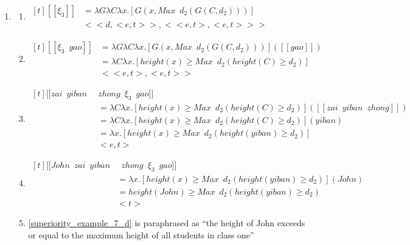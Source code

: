 \documentclass{ctexart}
\begin{document}
\begin{enumerate}
    \item \label{superiority_example_7}
    \begin{enumerate}
        \item \label{superiority_example_7_a}
        $\begin{aligned}[t]
            [\![\xi_3]\!] 
            &= \lambda G \lambda C \lambda x.[G(x,Max \enspace d_2(G(C,d_2)))] \\
            & <<d,<e,t>>,<<e,t>,<e,t>>>
        \end{aligned}$

        \item \label{superiority_example_7_b}
        $\begin{aligned}[t]
            [\![\xi_3 \enspace gao]\!] 
            &= \lambda G \lambda C \lambda x.[G(x,Max \enspace d_2(G(C,d_2)))]([\![gao]\!]) \\
            &= \lambda C \lambda x.[height(x) \geq Max \enspace d_2(height(C) \geq d_2)] \\ 
            &<<e,t>,<e,t>>
        \end{aligned}$

        \item \label{superiority_example_7_c}
        $\begin{aligned}[t]
            [\![zai \enspace yiban \enspace & zhong \enspace \xi_3 \enspace gao]\!] \\
            &= \lambda C \lambda x.[height(x) \geq Max \enspace d_2(height(C) \geq d_2)]([\![zai \enspace yiban \enspace zhong]\!]) \\
            &= \lambda C \lambda x.[height(x) \geq Max \enspace d_2(height(C) \geq d_2)](yiban) \\
            &= \lambda x.[height(x) \geq Max \enspace d_2(height(yiban) \geq d_2)] \\
            & <e,t>
        \end{aligned}$

        \item \label{superiority_example_7_d}
        $\begin{aligned}[t]
            [\![John \enspace zai \enspace yiban & \enspace zhong \enspace \xi_3 \enspace gao]\!] \\
            &= \lambda x.[height(x) \geq Max \enspace d_2(height(yiban) \geq d_2)](John) \\
            &= height(John) \geq Max \enspace d_2(height(yiban) \geq d_2) \\
            &<t>
        \end{aligned}$

        \item \label{superiority_example_7_e}
        \ref{superiority_example_7_d} is paraphrased as ``the height of John exceeds or equal to the  maximum height of all students in class one''

    \end{enumerate}
\end{enumerate}
\end{document}
